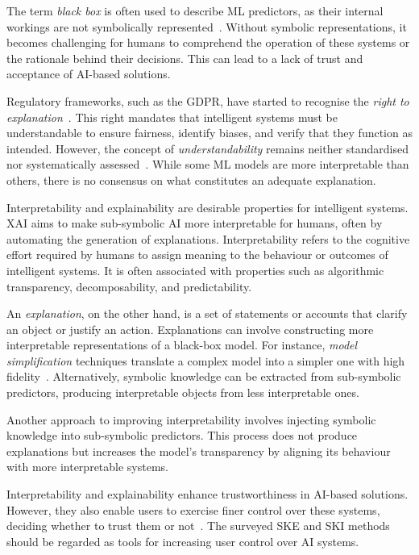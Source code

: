 The term \emph{black box} is often used to describe \gls{ML} predictors, as their internal workings are not symbolically represented~\cite{DBLP:journals/cacm/Lipton18}.
%
Without symbolic representations, it becomes challenging for humans to comprehend the operation of these systems or the rationale behind their decisions.
%
This can lead to a lack of trust and acceptance of \gls{AI}-based solutions.


Regulatory frameworks, such as the \gls{GDPR}, have started to recognise the \emph{right to explanation}~\cite{DBLP:journals/aim/GoodmanF17}.
%
This right mandates that intelligent systems must be understandable to ensure fairness, identify biases, and verify that they function as intended.
%
However, the concept of \emph{understandability} remains neither standardised nor systematically assessed~\cite{DBLP:journals/ai/Miller19}.
%
While some \gls{ML} models are more interpretable than others, there is no consensus on what constitutes an adequate explanation.


Interpretability and explainability are desirable properties for intelligent systems.
%
\Gls{XAI} aims to make sub-symbolic \gls{AI} more interpretable for humans, often by automating the generation of explanations.
%
Interpretability refers to the cognitive effort required by humans to assign meaning to the behaviour or outcomes of intelligent systems.
%
It is often associated with properties such as algorithmic transparency, decomposability, and predictability.


An \emph{explanation}, on the other hand, is a set of statements or accounts that clarify an object or justify an action.
%
Explanations can involve constructing more interpretable representations of a black-box model.
%
For instance, \emph{model simplification} techniques translate a complex model into a simpler one with high fidelity~\cite{DBLP:conf/kdd/TolomeiSHL17,DBLP:journals/csur/GuidottiMRTGP19}.
%
Alternatively, symbolic knowledge can be extracted from sub-symbolic predictors, producing interpretable objects from less interpretable ones.


Another approach to improving interpretability involves injecting symbolic knowledge into sub-symbolic predictors.
%
This process does not produce explanations but increases the model's transparency by aligning its behaviour with more interpretable systems.

Interpretability and explainability enhance trustworthiness in \gls{AI}-based solutions.
%
However, they also enable users to exercise finer control over these systems, deciding whether to trust them or not~\cite{10.1214/21-SS133}.
%
The surveyed \gls{SKE} and \gls{SKI} methods should be regarded as tools for increasing user control over \gls{AI} systems.


